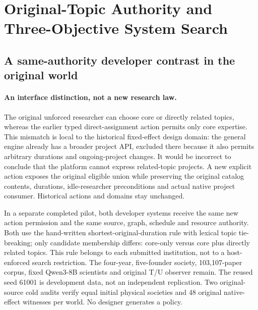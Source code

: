 \section{Original-Topic Authority and Three-Objective System Search}
\label{sec:native-topic-system-search}

\subsection{A same-authority developer contrast in the original world}
\paragraph{An interface distinction, not a new research law.}
The original unforced researcher can choose core or directly related topics,
whereas the earlier typed direct-assignment action permits only core expertise.
This mismatch is local to the historical fixed-effect design domain: the
general engine already has a broader project API, excluded there because it
also permits arbitrary durations and ongoing-project changes. It would be
incorrect to conclude that the platform cannot express related-topic projects.
A new explicit action exposes the original eligible union while preserving
the original catalog contents, durations, idle-researcher preconditions and
actual native project consumer. Historical actions and domains stay unchanged.

In a separate completed pilot, both developer systems receive the same new
action permission and the same source, graph, schedule and resource authority.
Both use the hand-written shortest-original-duration rule with lexical topic
tie-breaking; only candidate membership differs: core-only versus core plus
directly related topics. This rule belongs to each submitted institution, not
to a host-enforced search restriction. The four-year, five-founder society,
103,107-paper corpus, fixed Qwen3-8B scientists and original T/U observer remain.
The reused seed 61001 is development data, not an independent replication.
Two original-source cold audits verify equal initial physical societies and
48 original native-effect witnesses per world. No designer generates a policy.

